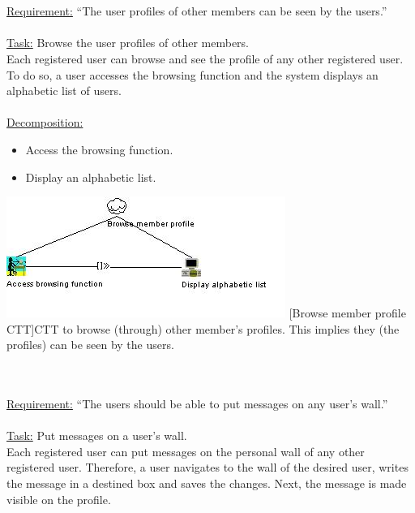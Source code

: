 \documentclass[11pt, a4paper,svglistings,oneside]{book}
\begin{document}
$\;$ \\ \\
\underline{Requirement:} ``The user profiles of other members can be seen by the users.'' \\ \\
\underline{Task:} Browse the user profiles of other members. \\
Each registered user can browse and see the profile of any other registered user. To do so, a user accesses the browsing function and the system displays an alphabetic list of users.\\ \\
\underline{Decomposition:}
\begin{itemize}
\item Access the browsing function.
\item Display an alphabetic list.
\end{itemize}
\noindent\begin{minipage}{\textwidth}
    \centering
   \includegraphics{CTT_Member_Profile.png}
 [Browse member profile CTT]{CTT to browse (through) other member's profiles. This implies they (the profiles) can be seen by the users.}
\end{minipage}
$\;$ \\ \\
\underline{Requirement:} ``The users should be able to put messages on any user's wall.'' \\ \\
\underline{Task:} Put messages on a user's wall. \\
Each registered user can put messages on the personal wall of any other registered user. Therefore, a user navigates to the wall of the desired user, writes the message in a destined box and saves the changes. Next, the message is made visible on the profile.\\ \\
\end{document}
